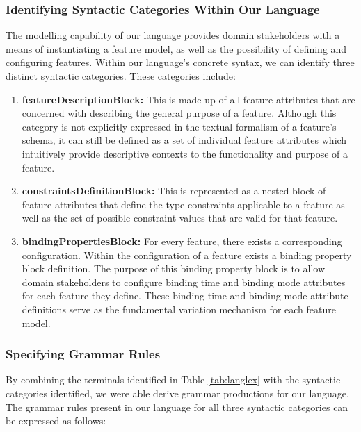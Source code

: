 \documentclass[conference]{IEEEtran}
\begin{document}
\subsubsection{Identifying Syntactic Categories Within Our Language}
The modelling capability of our language provides domain stakeholders with a means of instantiating a feature model, as well as the possibility of defining and configuring features. Within our language's concrete syntax, we can identify three distinct syntactic categories. These categories include:
\begin{enumerate}
    \item \textbf{featureDescriptionBlock:} This is made up of all feature attributes that are concerned with describing the general purpose of a feature. Although this category is not explicitly expressed in the textual formalism of a feature's schema, it can still be defined as a set of individual feature attributes which intuitively provide descriptive contexts to the functionality and purpose of a feature.
    \item \textbf{constraintsDefinitionBlock:} This is represented as a nested block of feature attributes that define the type constraints applicable to a feature as well as the set of possible constraint values that are valid for that feature.
    \item \textbf{bindingPropertiesBlock:} For every feature, there exists a corresponding configuration. Within the configuration of a feature exists a binding property block definition. The purpose of this binding property block is to allow domain stakeholders to configure binding time and binding mode attributes for each feature they define. These binding time and binding mode attribute definitions serve as the fundamental variation mechanism for each feature model.
\end{enumerate}
 
\subsubsection{Specifying Grammar Rules} By combining the terminals identified in Table \ref{tab:langlex} with the syntactic categories identified, we were able derive grammar productions for our language. The grammar rules present in our language for all three syntactic categories can be expressed as follows:\\
\end{document}
